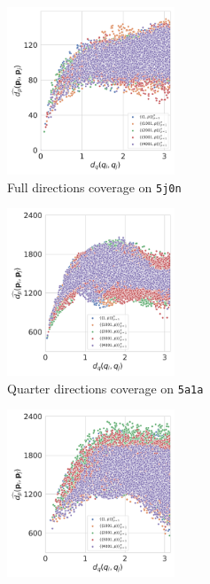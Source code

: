 \begin{figure}[ht!]
    \begin{minipage}[t]{0.99\linewidth}
        \begin{subfigure}[t]{0.33\textwidth}
            \centering
            \includegraphics[height=5cm]{figures/dPdQ_5j0n_euclidean2}
            \caption{Full directions coverage on \texttt{5j0n}}
            \label{fig:euclidean-not-robust:5j0n-full}
        \end{subfigure}
        \hfill
        \begin{subfigure}[t]{0.33\textwidth}
            \centering
            \includegraphics[height=5cm]{figures/dPdQ_5a1a_euclidean2}
            \caption{Quarter directions coverage on \texttt{5a1a}}
            \label{fig:euclidean-not-robust:5a1a-quarter}
        \end{subfigure}
        \hfill
        \begin{subfigure}[t]{0.33\textwidth}
            \centering
            \includegraphics[height=5cm]{figures/dPdQ_5a1a_full_euclidean2}

\end{subfigure}
\end{minipage}
\end{figure}
